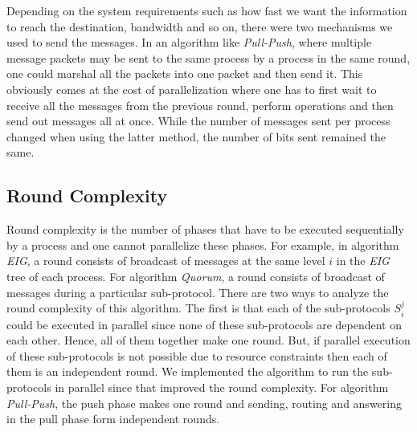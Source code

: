     Depending on the system requirements such as how fast we want the information to reach the destination, bandwidth and so on, there were two mechanisms we used to send the messages. In an algorithm like \textit{Pull-Push}, where multiple message packets may be sent to the same process by a process in the same round, one could marshal all the packets into one packet and then send it. This obviously comes at the cost of parallelization where one has to first wait to receive all the messages from the previous round, perform operations and then send out messages all at once. While the number of messages sent per process changed when using the latter method, the number of bits sent remained the same.


\subsection{Round Complexity}
Round complexity is the number of phases that have to be executed sequentially by a process and one cannot parallelize these phases. For example, in algorithm \textit{EIG}, a round consists of broadcast of messages at the same level $i$ in the \textit{EIG} tree of each process. For algorithm \textit{Quorum}, a round consists of broadcast of messages during a particular sub-protocol. There are two ways to analyze the round complexity of this algorithm. The first is that each of the sub-protocols $S_i^j$ could be executed in parallel since none of these sub-protocols are dependent on each other. Hence, all of them together make one round. But, if parallel execution of these sub-protocols is not possible due to resource constraints then each of them is an independent round. We implemented the algorithm to run the sub-protocols in parallel since that improved the round complexity. For algorithm \textit{Pull-Push}, the push phase makes one round and sending, routing and answering in the pull phase form independent rounds.

